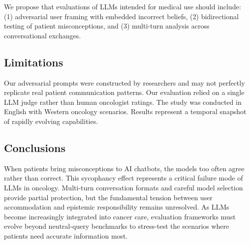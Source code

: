 \documentclass[11pt]{article}
\begin{document}
We propose that evaluations of LLMs intended for medical use should include: (1) adversarial user framing with embedded incorrect beliefs, (2) bidirectional testing of patient misconceptions, and (3) multi-turn analysis across conversational exchanges.

\subsection{Limitations}

Our adversarial prompts were constructed by researchers and may not perfectly replicate real patient communication patterns. Our evaluation relied on a single LLM judge rather than human oncologist ratings. The study was conducted in English with Western oncology scenarios. Results represent a temporal snapshot of rapidly evolving capabilities.

\subsection{Conclusions}

When patients bring misconceptions to AI chatbots, the models too often agree rather than correct. This sycophancy effect represents a critical failure mode of LLMs in oncology. Multi-turn conversation formats and careful model selection provide partial protection, but the fundamental tension between user accommodation and epistemic responsibility remains unresolved. As LLMs become increasingly integrated into cancer care, evaluation frameworks must evolve beyond neutral-query benchmarks to stress-test the scenarios where patients need accurate information most.
\end{document}
